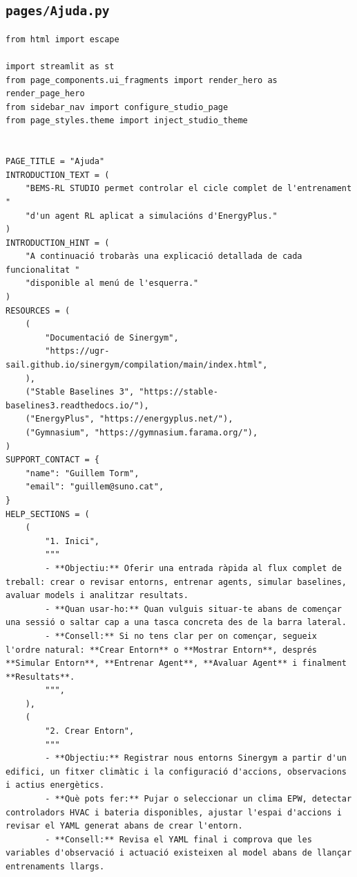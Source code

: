 \documentclass[10pt,a4paper]{article}
\begin{document}

\subsection{\texorpdfstring{\texttt{pages/Ajuda.py}}{pages/Ajuda.py}}

\begin{lstlisting}[style=studioPython,caption={pages/Ajuda.py},label={lst:pages-ajuda-py}]
from html import escape

import streamlit as st
from page_components.ui_fragments import render_hero as render_page_hero
from sidebar_nav import configure_studio_page
from page_styles.theme import inject_studio_theme


PAGE_TITLE = "Ajuda"
INTRODUCTION_TEXT = (
    "BEMS-RL STUDIO permet controlar el cicle complet de l'entrenament "
    "d'un agent RL aplicat a simulacións d'EnergyPlus."
)
INTRODUCTION_HINT = (
    "A continuació trobaràs una explicació detallada de cada funcionalitat "
    "disponible al menú de l'esquerra."
)
RESOURCES = (
    (
        "Documentació de Sinergym",
        "https://ugr-sail.github.io/sinergym/compilation/main/index.html",
    ),
    ("Stable Baselines 3", "https://stable-baselines3.readthedocs.io/"),
    ("EnergyPlus", "https://energyplus.net/"),
    ("Gymnasium", "https://gymnasium.farama.org/"),
)
SUPPORT_CONTACT = {
    "name": "Guillem Torm",
    "email": "guillem@suno.cat",
}
HELP_SECTIONS = (
    (
        "1. Inici",
        """
        - **Objectiu:** Oferir una entrada ràpida al flux complet de treball: crear o revisar entorns, entrenar agents, simular baselines, avaluar models i analitzar resultats.
        - **Quan usar-ho:** Quan vulguis situar-te abans de començar una sessió o saltar cap a una tasca concreta des de la barra lateral.
        - **Consell:** Si no tens clar per on començar, segueix l'ordre natural: **Crear Entorn** o **Mostrar Entorn**, després **Simular Entorn**, **Entrenar Agent**, **Avaluar Agent** i finalment **Resultats**.
        """,
    ),
    (
        "2. Crear Entorn",
        """
        - **Objectiu:** Registrar nous entorns Sinergym a partir d'un edifici, un fitxer climàtic i la configuració d'accions, observacions i actius energètics.
        - **Què pots fer:** Pujar o seleccionar un clima EPW, detectar controladors HVAC i bateria disponibles, ajustar l'espai d'accions i revisar el YAML generat abans de crear l'entorn.
        - **Consell:** Revisa el YAML final i comprova que les variables d'observació i actuació existeixen al model abans de llançar entrenaments llargs.

\end{lstlisting}
\end{document}
